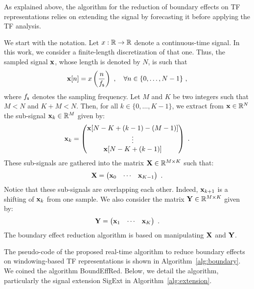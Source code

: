 As explained above, the algorithm for the reduction of boundary effects on TF representations relies on extending the signal by forecasting it before applying the TF analysis. 


We start with the notation. Let $x:{\mathbb R}\to{\mathbb R}$ denote a continuous-time signal. In this work, we consider a finite-length discretization of that one. Thus, the sampled signal ${\mathbf x}$, whose length is denoted by $N$, is such that
\[
\bx[n] = x\left(\frac{n}{\fs}\right)\ ,\quad \forall n\in\{0,\ldots,N-1\}\ , 
\]
where $f_{\mathsf s}$ denotes the sampling frequency. 
Let $M$ and $K$ be two integers such that $M<N$ and $K+M<N$. Then, for all $k\in\{0,\ldots,K-1\}$, we extract from ${\mathbf x}\in{\mathbb R}^N$ the sub-signal ${\mathbf x}_k\in{\mathbb R}^M$ given by:
\begin{equation}
\bx_k = 
\begin{pmatrix}
\bx[N-K+(k-1)-(M-1)] \\
\vdots \\
\bx[N-K+(k-1)]
\end{pmatrix}\ .
\label{eq:xk}
\end{equation} 
These sub-signals are gathered into the matrix ${\mathbf X}\in{\mathbb R}^{M\times K}$ such that:
\begin{equation*}
{\mathbf X} = 
\begin{pmatrix}
{\mathbf x}_0 & \cdots & {\mathbf x}_{K-1}
\end{pmatrix}\ .
\end{equation*}
Notice that these sub-signals are overlapping each other. Indeed, ${\mathbf x}_{k+1}$ is a shifting of ${\mathbf x}_k$ from one sample. We also consider the matrix ${\mathbf Y}\in{\mathbb R}^{M\times K}$ given by:
\begin{equation*}
{\mathbf Y} = 
\begin{pmatrix}
{\mathbf x}_1 & \cdots & {\mathbf x}_{K}
\end{pmatrix}\ .
\end{equation*}
The boundary effect reduction algorithm is based on manipulating ${\mathbf X}$ and ${\mathbf Y}$.

%
The pseudo-code of the proposed real-time algorithm to reduce boundary effects on windowing-based TF representations is shown in Algorithm~\ref{alg:boundary}. We coined the algorithm {\sf BoundEffRed}. Below, we detail the algorithm, particularly the signal extension {\sf SigExt} in Algorithm~\ref{alg:extension}.


